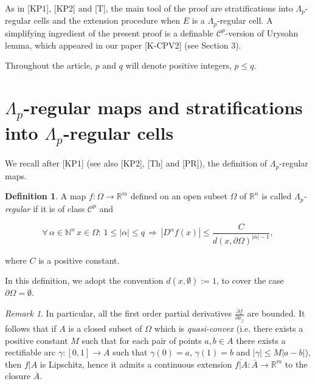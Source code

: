 \documentclass[12pt]{amsart}
\theoremstyle{definition}
\newtheorem{defn}[thm]{Definition}
\theoremstyle{remark}
\newtheorem{rem}[thm]{Remark}
\numberwithin{equation}{section}
\newcommand{\Real}{\mathbb R}
\begin{document}
\bigskip
As in [KP1], [KP2] and [T], the main tool of the proof are stratifications into $\varLambda_p$-regular cells and the extension procedure when $E$ is a $\varLambda_p$-regular cell. A simplifying ingredient of the present proof is  a definable $\mathcal{C}^p$-version of Urysohn lemma, which appeared in our paper [K-CPV2] (see Section 3).

\bigskip
Throughout the article, $p$ and $q$ will denote positive integers, $p\leq q$.

\bigskip
\section{$\varLambda_p$-regular maps and stratifications into $\varLambda_p$-regular cells}

We recall after [KP1] (see also [KP2], [Th] and [PR]), the definition of $\varLambda_p$-regular maps.

\medskip
\begin{defn} A  map $f:\varOmega\longrightarrow \Real^m$ defined on an open subset $\varOmega$ of $\Real^n$ is called \emph{$\varLambda_p$-regular} if it is of class $\mathcal{C}^p$ and

$$
\forall\, \alpha\in \mathbb{N}^n \, x\in \varOmega: \, 1\leq |\alpha|\leq q \, \Longrightarrow \, |D^{\alpha}f(x)|\leq \frac{C}{d(x,\partial \varOmega)^{|\alpha|-1}},
$$

\noindent
where $C$ is a positive constant.

In this definition, we adopt the convention $d(x,\emptyset):= 1$, to cover the case $\partial\varOmega = \emptyset$.
\end{defn}

\medskip
\begin{rem} In particular, all the first order partial derivatives $\frac{\partial f}{\partial x_j}$ are bounded. It follows that if $A$ is a  closed subset of $\varOmega$ which is \emph{quasi-convex} (i.e. there exists a positive constant $M$ such that for each pair of points $a, b\in A$ there exists a rectifiable arc $\gamma: [0, 1]\longrightarrow A$ such that $\gamma(0)=a$, $\gamma(1)=b$ and $|\gamma|\leq M|a - b|$), then $f|A$ is Lipschitz, hence it admits a continuous extension $\overline{f|A}: \overline{A}\longrightarrow \Real^m$ to the closure $\overline{A}$.
\end{rem}
\end{document}
